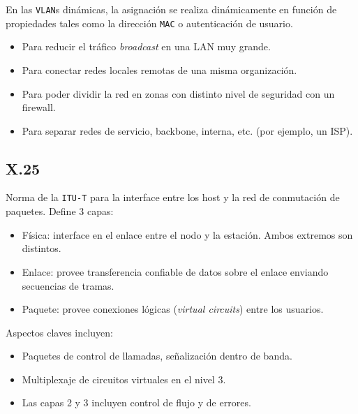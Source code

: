 \documentclass[]{article}
\begin{document}
En las \texttt{VLAN}s dinámicas, la asignación se realiza dinámicamente en función de propiedades tales como la dirección \texttt{MAC} o autenticación de usuario.


\begin{itemize}
    \item Para reducir el tráfico \emph{broadcast} en una LAN muy grande.
    \item Para conectar redes locales remotas de una misma organización.
    \item Para poder dividir la red en zonas con distinto nivel de seguridad con un firewall.
    \item Para separar redes de servicio, backbone, interna, etc. (por ejemplo, un ISP).
\end{itemize}


\subsection{X.25}
Norma de la \texttt{ITU-T} para la interface entre los host y la red de conmutación de paquetes. Define 3 capas:

\begin{itemize}
    \item Física: interface en el enlace entre el nodo y la estación. Ambos extremos son distintos.
    \item Enlace: provee transferencia confiable de datos sobre el enlace enviando secuencias de tramas.
    \item Paquete: provee conexiones lógicas (\emph{virtual circuits}) entre los usuarios.
\end{itemize}

Aspectos claves incluyen:
\begin{itemize}
    \item Paquetes de control de llamadas, señalización dentro de banda.
    \item Multiplexaje de circuitos virtuales en el nivel 3.
    \item Las capas 2 y 3 incluyen control de flujo y de errores.
\end{itemize}


\end{document}
